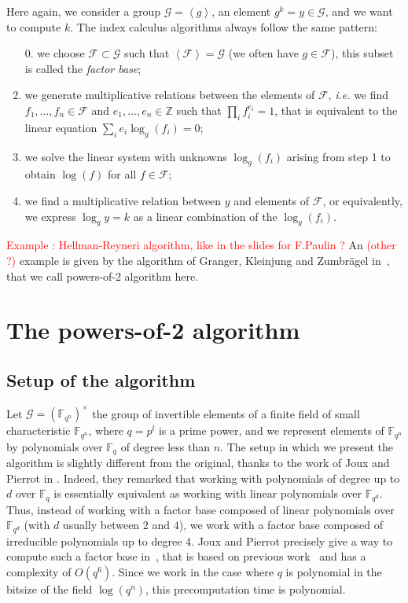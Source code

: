 \documentclass[a4paper,11pt]{article}
\theoremstyle{break}
\theoremstyle{sc}
\theoremstyle{definition}
\theoremstyle{remark}
\newcommand{\ie}{\emph{i.e. }}
\begin{document}
Here again, we consider a group $\mathcal G=\left\langle g \right\rangle$, an element
$g^k = y\in \mathcal G$, and we want to compute $k$. The index calculus algorithms always
follow the same pattern:
\begin{enumerate}
  \item[0.] we choose $\mathcal F\subset \mathcal G$ such that $\left\langle
    \mathcal F \right\rangle = \mathcal G$
    (we often have $g\in \mathcal F$), this subset is called the \emph{factor base};
  \item we generate multiplicative relations between the elements of $\mathcal F$, \ie we
    find $f_1, \dots, f_n \in \mathcal F$ and $e_1, \dots, e_n\in \mathbb{Z}$ such that
    $\prod_i f_i^{e_i} = 1$, that is equivalent to the linear equation $\sum_i
    e_i\log_g(f_i) = 0$;
  \item we solve the linear system with unknowns $\log_g(f_i)$ arising from step
    1 to obtain $\log(f)$ for all $f\in \mathcal F$;
  \item we find a multiplicative relation between $y$ and elements of $\mathcal F$, or
    equivalently, we express $\log_g y = k$ as a linear combination of the
  $\log_g(f_i)$.
\end{enumerate}
\textcolor{red}{Example : Hellman-Reyneri algorithm, like in the slides for
  F.Paulin ?}
  \newline
  \newline
  An \textcolor{red}{(other ?)} example is given by the algorithm of Granger,
  Kleinjung and Zumbrägel in~\cite{GKZ14}, that we call powers-of-2 algorithm here.
\section{The powers-of-2 algorithm}
\subsection{Setup of the algorithm}

Let $\mathcal G = (\mathbb{F}_{q^n})^\times$ the group of invertible elements of a finite
field of small characteristic $\mathbb{F}_{q^n}$, where $q=p^l$ is a prime
power, and we represent elements of $\mathbb{F}_{q^n}$ by polynomials over
$\mathbb{F}_q$ of degree less than $n$. The setup in which we present the algorithm is slightly different from
the original, thanks to the work of Joux and Pierrot in \cite{JP14}. Indeed,
they remarked that working with polynomials of degree up to $d$ over $\mathbb{F}_q$ is
essentially equivalent as working with linear polynomials over $\mathbb{F}_{q^d}$. Thus,
instead of working with a factor base composed of linear polynomials over
$\mathbb{F}_{q^d}$ (with $d$ usually between $2$ and $4$), we work with a
factor base composed of irreducible polynomials up to degree $4$. Joux and Pierrot
precisely give a way to compute such a factor base in~\cite{JP14}, that is based
on previous work~\cite{Joux13, BGJT13} and has a complexity of $O(q^6)$. Since
we work in the case where $q$ is polynomial in the bitsize of the field
$\log(q^n)$, this precomputation time is polynomial.
\end{document}
